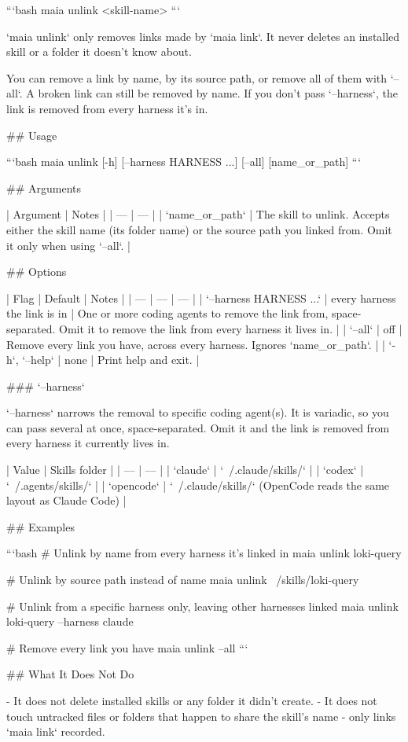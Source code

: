 ```bash
maia unlink <skill-name>
```

`maia unlink` only removes links made by `maia link`.
It never deletes an installed skill or a folder it doesn't know about.

You can remove a link by name, by its source path, or remove all of them with `--all`.
A broken link can still be removed by name.
If you don't pass `--harness`, the link is removed from every harness it's in.

## Usage

```bash
maia unlink [-h] [--harness HARNESS ...] [--all] [name_or_path]
```

## Arguments

| Argument | Notes |
| --- | --- |
| `name_or_path` | The skill to unlink. Accepts either the skill name (its folder name) or the source path you linked from. Omit it only when using `--all`. |

## Options

| Flag | Default | Notes |
| --- | --- | --- |
| `--harness HARNESS ...` | every harness the link is in | One or more coding agents to remove the link from, space-separated. Omit it to remove the link from every harness it lives in. |
| `--all` | off | Remove every link you have, across every harness. Ignores `name_or_path`. |
| `-h`, `--help` | none | Print help and exit. |

### `--harness`

`--harness` narrows the removal to specific coding agent(s).
It is variadic, so you can pass several at once, space-separated.
Omit it and the link is removed from every harness it currently lives in.

| Value | Skills folder |
| --- | --- |
| `claude` | `~/.claude/skills/` |
| `codex` | `~/.agents/skills/` |
| `opencode` | `~/.claude/skills/` (OpenCode reads the same layout as Claude Code) |

## Examples

```bash
# Unlink by name from every harness it's linked in
maia unlink loki-query

# Unlink by source path instead of name
maia unlink ~/skills/loki-query

# Unlink from a specific harness only, leaving other harnesses linked
maia unlink loki-query --harness claude

# Remove every link you have
maia unlink --all
```

## What It Does Not Do

- It does not delete installed skills or any folder it didn't create.
- It does not touch untracked files or folders that happen to share the skill's name - only links `maia link` recorded.


